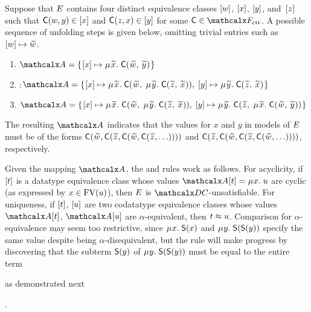 \begin{examplex}
Suppose that $E$ contains four distinct equivalence classes $[w]$, $[x]$, $[y]$, and~$[z]$
such that $\textsf{C}(w,y) \in [x]$ and $\textsf{C}(z,x) \in [y]$ for some $\const{C} \in \Ctr$.
A possible sequence of unfolding steps is given below, omitting
trivial entries such as $\ec{w} \mapsto {\Varec{w}}$.
%
\begin{enumerate}
\item \noindent{}$\Val = \{\vthinspace  \ec{x} \mapsto \MU {\Varec{x}}.\; \const{C}( {\Varec{w}},\, {\Varec{y}} ) \vthinspace\}$
\item \noindent{}:\enskip$\Val = \{\vthinspace  \ec{x} \mapsto \MU {\Varec{x}}.\; \const{C}( {\Varec{w}},\; \MU {\Varec{y}}.\; \const{C}( {\Varec{z}},\, {\Varec{x}} ) ),\;
  \ec{y} \mapsto \MU {\Varec{y}}.\; \const{C}( {\Varec{z}},\, {\Varec{x}} ) \vthinspace\}$
\item \noindent{}$\Val = \{\vthinspace  \ec{x} \mapsto \MU {\Varec{x}}.\; \const{C}( {\Varec{w}},\; \MU {\Varec{y}}.\; \const{C}( {\Varec{z}},\, {\Varec{x}} ) ),\;
  \ec{y} \mapsto \MU {\Varec{y}}.\; \const{C}( {\Varec{z}},\; \MU {\Varec{x}}.\; \const{C}( {\Varec{w}},\, {\Varec{y}} ) ) \vthinspace\}$
\end{enumerate}
%
The resulting $\Val$ indicates that the values for $x$ and $y$ in models of $E$
must be of the forms $\const{C}( {\Varec{w}}, \const{C}( {\Varec{z}},\allowbreak \const{C}( {\Varec{w}},\allowbreak \const{C}( {\Varec{z}},\ldots ))))$
and $\const{C}( {\Varec{z}}, \const{C}( {\Varec{w}}, \const{C}( {\Varec{z}}, \const{C}( {\Varec{w}}, \ldots ))))$,
respectively. %
\xend
\end{examplex}

Given the mapping $\Val$, the  and  rules work as follows.
For acyclicity, if $[t]$ is a datatype equivalence class
whose values $\Val \ec{t} = \MU x.\; u$ are cyclic
(as expressed by $x \in \mathrm{FV}( u )$),
then $E$ is $\thD$-unsatisfiable.
For uniqueness, if $[t]$, $[u]$ are two codatatype equivalence classes
whose values $\Val \ec{t}$, $\Val \ec{u}$ are $\alpha$-equivalent,
then $t \approx u$. Comparison for $\alpha$-equivalence may seem too restrictive, since
$\MU x.\; \const{S}(x)$ and $\MU y.\; \const{S}(\const{S}(y))$ specify the same
value despite being $\alpha$-disequivalent, but the rule will
make progress by discovering that the subterm $\textsf{S}(y)$ of $\MU y.\;
\const{S}(\const{S}(y))$ must be equal to the entire term\begin{rep}
as demonstrated next\end{rep}.

